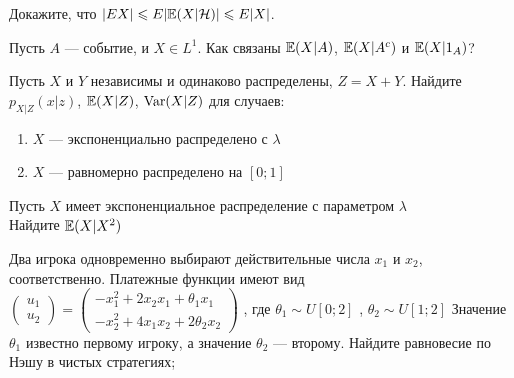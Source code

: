\begin{problem}
Докажите, что $|EX|\leqslant E|\mathbb{E}(X|\mathcal{H})|\leqslant E|X|$.

\begin{sol}

\end{sol}
\end{problem}

\begin{problem}
Пусть $A$ — событие, и $X\in L^{1}$. Как связаны $\mathbb{E}(X|A)$,
$\mathbb{E}(X|A^{c})$ и $\mathbb{E}(X|1_{A})$?

\begin{sol}

\end{sol}
\end{problem}

\begin{problem}
Пусть $X$ и $Y$ независимы и одинаково распределены, $Z=X+Y$. Найдите $p_{X|Z}(x|z)$, $\mathbb{E}(X|Z)$, $\operatorname{Var}(X|Z)$ для случаев:
\begin{enumerate}
\item  $X$ — экспоненциально распределено с $\lambda$
\item $X$ — равномерно распределено на $[0;1]$
\end{enumerate}

\begin{sol}

\end{sol}
\end{problem}

\begin{problem}
Пусть $X$ имеет экспоненциальное распределение с параметром $\lambda$ \\
Найдите $\mathbb{E}(X|X^{2})$

\begin{sol}

\end{sol}
\end{problem}

\begin{problem}
Два игрока одновременно выбирают действительные числа  $x_{1} $  и
$x_{2} $, соответственно. Платежные функции имеют вид
 $\left(\begin{array}{l} {u_{1} } \\
 {u_{2} } \end{array}\right)=
 \left(\begin{array}{l} {-x_{1}^{2} +2x_{2} x_{1} +\theta _{1} x_{1} } \\
 {-x_{2}^{2} +4x_{1} x_{2} +2\theta _{2} x_{2} } \end{array}\right)$ ,
 где  $\theta _{1} \sim U\left[0;2\right]$ ,  $\theta _{2} \sim U\left[1;2\right]$
Значение  $\theta _{1} $  известно первому игроку, а значение
$\theta _{2} $  — второму. Найдите равновесие по Нэшу в чистых
стратегиях;

\begin{sol}

\end{sol}
\end{problem}

